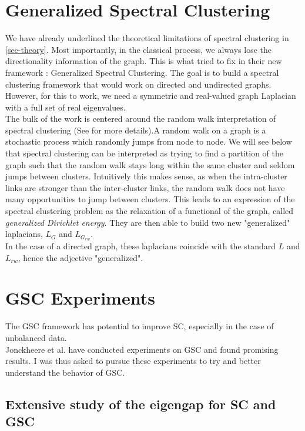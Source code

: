 \documentclass[a4paper,12pt]{article}
\theoremstyle{definition}
\theoremstyle{plain}
\begin{document}
\section{Generalized Spectral Clustering} \label{sec-gsc}
We have already underlined the theoretical limitations of spectral clustering in \ref{sec-theory}. Most importantly, in the classical process, we always lose the directionality information of the graph. This is what \cite[Jonckheere et al.]{GSC} tried to fix in their new framework : Generalized Spectral Clustering. The goal is to build a spectral clustering framework that would work on directed and undirected graphs. However, for this to work, we need a symmetric and real-valued graph Laplacian with a full set of real eigenvalues.\\ The bulk of the work is centered around the random walk interpretation of spectral clustering (See \cite{tutorial} for more details).A random walk on a graph is a stochastic process which randomly jumps from node to node.
We will see below that spectral clustering can be interpreted as trying to find a partition of the graph
such that the random walk stays long within the same cluster and seldom jumps between clusters.
Intuitively this makes sense, as when the intra-cluster links are stronger than the inter-cluster links, the random walk does not have
many opportunities to jump between clusters.
This leads to an expression of the spectral clustering problem as the relaxation of a functional of the graph, called \textit{generalized Dirichlet energy}. 
They are then able to build two new "generalized" laplacians, $L_{G}$ and $L_{G_{rw}}$. \\
In the case of a directed graph, these laplacians coincide with the standard $L$ and $L_{rw}$, hence the adjective "generalized". \\

\section{GSC Experiments}
The GSC framework has potential to improve SC, especially in the case of unbalanced data.\\
Jonckheere et al. have conducted experiments on GSC and found promising results. I was thus asked to pursue these experiments to try and better understand the behavior of GSC.
\subsection{Extensive study of the eigengap for SC and GSC}
\end{document}
